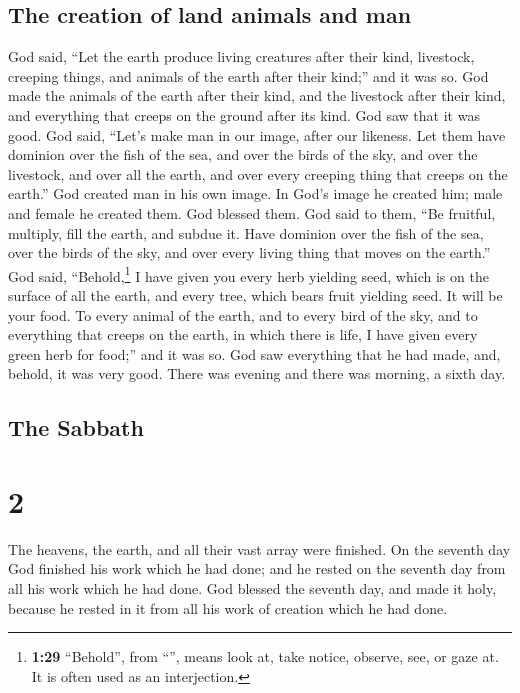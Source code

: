 \hypertarget{the-creation-of-land-animals-and-man}{%
\subsection{The creation of land animals and
man}\label{the-creation-of-land-animals-and-man}}

 God said, ``Let the earth produce living creatures after
their kind, livestock, creeping things, and animals of the earth after
their kind;'' and it was so.  God made the animals of the
earth after their kind, and the livestock after their kind, and
everything that creeps on the ground after its kind. God saw that it was
good.  God said, ``Let's make man in our image, after our
likeness. Let them have dominion over the fish of the sea, and over the
birds of the sky, and over the livestock, and over all the earth, and
over every creeping thing that creeps on the earth.'' 
God created man in his own image. In God's image he created him; male
and female he created them.  God blessed them. God said
to them, ``Be fruitful, multiply, fill the earth, and subdue it. Have
dominion over the fish of the sea, over the birds of the sky, and over
every living thing that moves on the earth.''  God said,
``Behold,\footnote{\textbf{1:29} ``Behold'', from ``'',
  means look at, take notice, observe, see, or gaze at. It is often used
  as an interjection.} I have given you every herb yielding seed, which
is on the surface of all the earth, and every tree, which bears fruit
yielding seed. It will be your food.  To every animal of
the earth, and to every bird of the sky, and to everything that creeps
on the earth, in which there is life, I have given every green herb for
food;'' and it was so.  God saw everything that he had
made, and, behold, it was very good. There was evening and there was
morning, a sixth day.

\hypertarget{the-sabbath}{%
\subsection{The Sabbath}\label{the-sabbath}}

\hypertarget{section-1}{%
\section{2}\label{section-1}}

 The heavens, the earth, and all their vast array were
finished.  On the seventh day God finished his work which
he had done; and he rested on the seventh day from all his work which he
had done.  God blessed the seventh day, and made it holy,
because he rested in it from all his work of creation which he had done.

